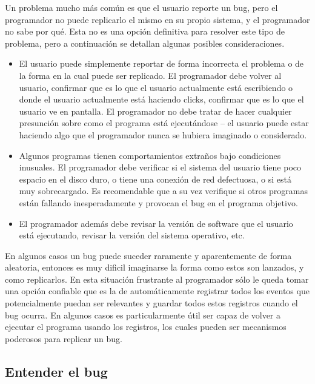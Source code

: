 \documentclass[12pt,legalpaper]{report}
\begin{document}
Un problema mucho más común es que el usuario reporte un bug, pero el programador no puede replicarlo el mismo en su propio sistema, y el programador no sabe por qué.  Esta no es una opción definitiva para resolver este tipo de problema, pero a continuación se detallan algunas posibles consideraciones.

\begin{itemize}
	\item El usuario puede simplemente reportar de forma incorrecta el problema o de la forma en la cual puede ser replicado.  El programador debe volver al usuario, confirmar que es lo que el usuario actualmente está escribiendo o donde el usuario actualmente está haciendo clicks, confirmar que es lo que el usuario ve en pantalla.  El programador no debe tratar de hacer cualquier presunción sobre como el programa está ejecutándose -- el usuario puede estar haciendo algo que el programador nunca se hubiera imaginado o considerado.

    \item Algunos programas tienen comportamientos extraños bajo condiciones inusuales.  El programador debe verificar si el sistema del usuario tiene poco espacio en el disco duro, o tiene una conexión de red defectuosa, o si está muy sobrecargado.  Es recomendable que a su vez verifique si otros programas están fallando inesperadamente y provocan el bug en el programa objetivo.

    \item El programador además debe revisar la versión de software que el usuario está ejecutando, revisar la versión del sistema operativo, etc.
\end{itemize}

En algunos casos un bug puede suceder raramente y aparentemente de forma aleatoria, entonces es muy dificil imaginarse la forma como estos son lanzados, y como replicarlos.  En esta situación frustrante al programador sólo le queda tomar una opción confiable que es la de automáticamente registrar todos los eventos que potencialmente puedan ser relevantes y guardar todos estos registros cuando el bug ocurra.  En algunos casos es particularmente útil ser capaz de volver a ejecutar el programa usando los registros, los cuales pueden ser mecanismos poderosos para replicar un bug.


\subsection{Entender el bug}
\end{document}
